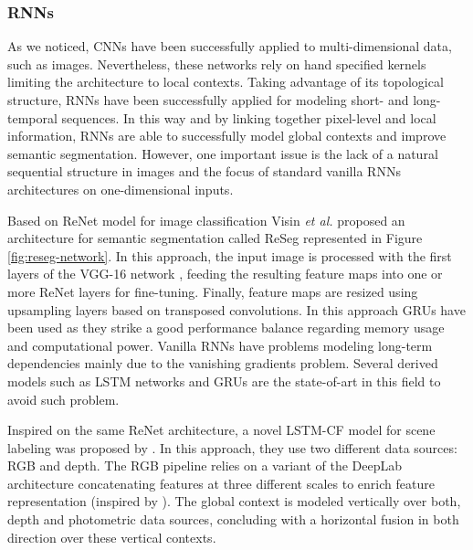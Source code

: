 \subsubsection{\aclp{RNN}}

\begin{figure*}[!t]
	\centering
	\caption{Representation of ReSeg network. VGG-16 convolutional layers are represented by the blue and yellow first layers. The rest of the architecture is based on the ReNet approach with fine-tuning purposes. Figure extracted from \cite{Visin2016}.}
	\label{fig:reseg-network}
\end{figure*}

As we noticed, \acp{CNN} have been successfully applied to multi-dimensional data, such as images. Nevertheless, these networks rely on hand specified kernels limiting the architecture to local contexts. Taking advantage of its topological structure, \aclp{RNN} have been successfully applied for modeling short- and long-temporal sequences. In this way and by linking together pixel-level and local information, \acp{RNN} are able to successfully model global contexts and improve semantic segmentation. However, one important issue is the lack of a natural sequential structure in images and the focus of standard vanilla \acp{RNN} architectures on one-dimensional inputs.  
	
Based on ReNet model for image classification Visin \emph{et al.}\cite{Visin2015} proposed an architecture for semantic segmentation called ReSeg \cite{Visin2016} represented in Figure \ref{fig:reseg-network}. In this approach, the input image is processed with the first layers of the \acs{VGG}-16 network \cite{Simonyan2014}, feeding the resulting feature maps into one or more ReNet layers for fine-tuning. Finally, feature maps are resized using upsampling layers based on transposed convolutions. In this approach \acp{GRU} have been used as they strike a good performance balance regarding memory usage and computational power. Vanilla \acsp{RNN} have problems modeling long-term dependencies mainly due to the vanishing gradients problem. Several derived models such as \ac{LSTM} networks \cite{Hochreiter1997} and \acp{GRU} \cite{Cho2014} are the state-of-art in this field to avoid such problem. 

Inspired on the same ReNet architecture, a novel \ac{LSTM-CF} model for scene labeling was proposed by \cite{ZhenLi2016}. In this approach, they use two different data sources: \acs{RGB} and depth. The \acs{RGB} pipeline relies on a variant of the DeepLab architecture \cite{Chen2014} concatenating features at three different scales to enrich feature representation (inspired by \cite{Li2016}). The global context is modeled vertically over both, depth and photometric data sources, concluding with a horizontal fusion in both direction over these vertical contexts.


